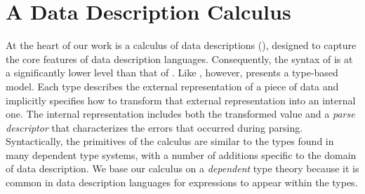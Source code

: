 \section{A Data Description Calculus}

At the heart of our work is a calculus of data descriptions (\ddc{}),
designed to capture the core features of data description languages. Consequently, the syntax of \ddc{} is at a significantly lower level than that of \ipads{}.  Like \ipads{}, however, \ddc{} presents a type-based model.  Each \ddc{} type describes the external representation of a piece of data and implicitly specifies how to transform that external representation into an internal one.  The internal representation includes both the transformed value and a \textit{parse descriptor} that characterizes the errors that occurred during parsing. Syntactically, the primitives of the calculus are
similar to the types found in many dependent type systems, with a
number of additions specific to the domain of data description.  
We base our calculus on a \textit{dependent} type theory
because it is common in data description languages for expressions to appear within the types. 


